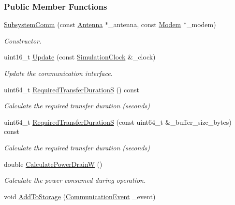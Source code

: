 \subsubsection*{Public Member Functions}
\begin{DoxyCompactItemize}
\item 
\hyperlink{classosse_1_1collaborate_1_1_subsystem_comm_a4723a445928f1dccc2734fae58cfaa3e}{Subsystem\+Comm} (const \hyperlink{classosse_1_1collaborate_1_1_antenna}{Antenna} $\ast$\+\_\+antenna, const \hyperlink{classosse_1_1collaborate_1_1_modem}{Modem} $\ast$\+\_\+modem)
\begin{DoxyCompactList}\small\item\em Constructor. \end{DoxyCompactList}\item 
uint16\+\_\+t \hyperlink{classosse_1_1collaborate_1_1_subsystem_comm_ab3675c014fa2575e699a43f870c1d4f0}{Update} (const \hyperlink{classosse_1_1collaborate_1_1_simulation_clock}{Simulation\+Clock} \&\+\_\+clock)
\begin{DoxyCompactList}\small\item\em Update the communication interface. \end{DoxyCompactList}\item 
uint64\+\_\+t \hyperlink{classosse_1_1collaborate_1_1_subsystem_comm_ae3626e8fd31433972e7b69aa25fb9375}{Required\+Transfer\+DurationS} () const
\begin{DoxyCompactList}\small\item\em Calculate the required transfer duration (seconds) \end{DoxyCompactList}\item 
uint64\+\_\+t \hyperlink{classosse_1_1collaborate_1_1_subsystem_comm_a7c3f63458bc096bbe875aea53d2bf748}{Required\+Transfer\+DurationS} (const uint64\+\_\+t \&\+\_\+buffer\+\_\+size\+\_\+bytes) const
\begin{DoxyCompactList}\small\item\em Calculate the required transfer duration (seconds) \end{DoxyCompactList}\item 
double \hyperlink{classosse_1_1collaborate_1_1_subsystem_comm_a19ba433f23b428c1864f33e3b8588639}{Calculate\+Power\+DrainW} ()
\begin{DoxyCompactList}\small\item\em Calculate the power consumed during operation. \end{DoxyCompactList}\item 
void \hyperlink{classosse_1_1collaborate_1_1_subsystem_comm_ae50e83fd95a6bf1b918a0971833f9615}{Add\+To\+Storage} (\hyperlink{structosse_1_1collaborate_1_1_subsystem_comm_1_1_communication_event}{Communication\+Event} \+\_\+event)

\end{DoxyCompactItemize}
